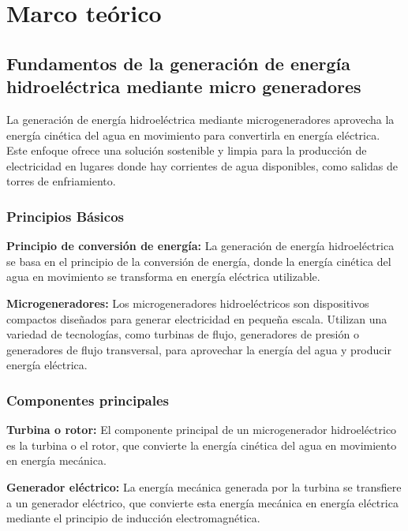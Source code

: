 \documentclass[11pt]{article}
\begin{document}
    \section{Marco teórico}
            \subsection{Fundamentos de la generación de energía hidroeléctrica mediante micro
                        generadores}
            La generación de energía hidroeléctrica mediante microgeneradores aprovecha la energía
            cinética del agua en movimiento para convertirla en energía eléctrica. Este enfoque ofrece
            una solución sostenible y limpia para la producción de electricidad en lugares donde hay
            corrientes de agua disponibles, como salidas de torres de enfriamiento. 

            
            \subsubsection{Principios Básicos}

            \textbf{Principio de conversión de energía:} La generación de energía hidroeléctrica se basa en el
            principio de la conversión de energía, donde la energía cinética del agua en movimiento se
            transforma en energía eléctrica utilizable.

            \textbf{Microgeneradores: } Los microgeneradores hidroeléctricos son dispositivos compactos
            diseñados para generar electricidad en pequeña escala. Utilizan una variedad de
            tecnologías, como turbinas de flujo, generadores de presión o generadores de flujo
            transversal, para aprovechar la energía del agua y producir energía eléctrica.
            
            
            \subsubsection{Componentes principales}

            \textbf{Turbina o rotor:} El componente principal de un microgenerador hidroeléctrico es la turbina o
            el rotor, que convierte la energía cinética del agua en movimiento en energía mecánica.
            
            \textbf{Generador eléctrico:} La energía mecánica generada por la turbina se transfiere a un
            generador eléctrico, que convierte esta energía mecánica en energía eléctrica mediante el
            principio de inducción electromagnética.
\end{document}
